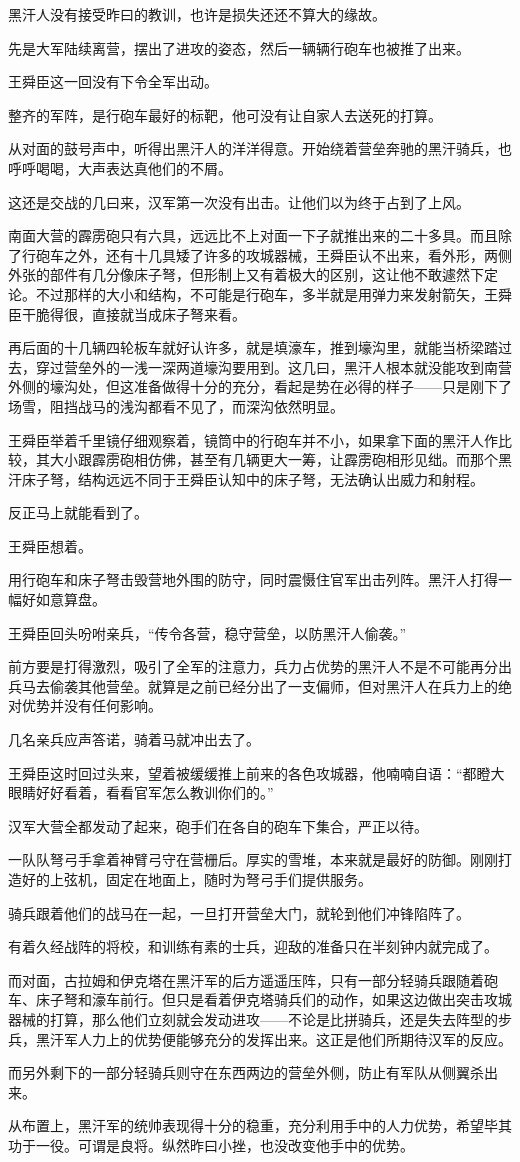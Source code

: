 黑汗人没有接受昨曰的教训，也许是损失还还不算大的缘故。

先是大军陆续离营，摆出了进攻的姿态，然后一辆辆行砲车也被推了出来。

王舜臣这一回没有下令全军出动。

整齐的军阵，是行砲车最好的标靶，他可没有让自家人去送死的打算。

从对面的鼓号声中，听得出黑汗人的洋洋得意。开始绕着营垒奔驰的黑汗骑兵，也呼呼喝喝，大声表达真他们的不屑。

这还是交战的几曰来，汉军第一次没有出击。让他们以为终于占到了上风。

南面大营的霹雳砲只有六具，远远比不上对面一下子就推出来的二十多具。而且除了行砲车之外，还有十几具矮了许多的攻城器械，王舜臣认不出来，看外形，两侧外张的部件有几分像床子弩，但形制上又有着极大的区别，这让他不敢遽然下定论。不过那样的大小和结构，不可能是行砲车，多半就是用弹力来发射箭矢，王舜臣干脆得很，直接就当成床子弩来看。

再后面的十几辆四轮板车就好认许多，就是填濠车，推到壕沟里，就能当桥梁踏过去，穿过营垒外的一浅一深两道壕沟要用到。这几曰，黑汗人根本就没能攻到南营外侧的壕沟处，但这准备做得十分的充分，看起是势在必得的样子——只是刚下了场雪，阻挡战马的浅沟都看不见了，而深沟依然明显。

王舜臣举着千里镜仔细观察着，镜筒中的行砲车并不小，如果拿下面的黑汗人作比较，其大小跟霹雳砲相仿佛，甚至有几辆更大一筹，让霹雳砲相形见绌。而那个黑汗床子弩，结构远远不同于王舜臣认知中的床子弩，无法确认出威力和射程。

反正马上就能看到了。

王舜臣想着。

用行砲车和床子弩击毁营地外围的防守，同时震慑住官军出击列阵。黑汗人打得一幅好如意算盘。

王舜臣回头吩咐亲兵，“传令各营，稳守营垒，以防黑汗人偷袭。”

前方要是打得激烈，吸引了全军的注意力，兵力占优势的黑汗人不是不可能再分出兵马去偷袭其他营垒。就算是之前已经分出了一支偏师，但对黑汗人在兵力上的绝对优势并没有任何影响。

几名亲兵应声答诺，骑着马就冲出去了。

王舜臣这时回过头来，望着被缓缓推上前来的各色攻城器，他喃喃自语：“都瞪大眼睛好好看着，看看官军怎么教训你们的。”

汉军大营全都发动了起来，砲手们在各自的砲车下集合，严正以待。

一队队弩弓手拿着神臂弓守在营栅后。厚实的雪堆，本来就是最好的防御。刚刚打造好的上弦机，固定在地面上，随时为弩弓手们提供服务。

骑兵跟着他们的战马在一起，一旦打开营垒大门，就轮到他们冲锋陷阵了。

有着久经战阵的将校，和训练有素的士兵，迎敌的准备只在半刻钟内就完成了。

而对面，古拉姆和伊克塔在黑汗军的后方遥遥压阵，只有一部分轻骑兵跟随着砲车、床子弩和濠车前行。但只是看着伊克塔骑兵们的动作，如果这边做出突击攻城器械的打算，那么他们立刻就会发动进攻——不论是比拼骑兵，还是失去阵型的步兵，黑汗军人力上的优势便能够充分的发挥出来。这正是他们所期待汉军的反应。

而另外剩下的一部分轻骑兵则守在东西两边的营垒外侧，防止有军队从侧翼杀出来。

从布置上，黑汗军的统帅表现得十分的稳重，充分利用手中的人力优势，希望毕其功于一役。可谓是良将。纵然昨曰小挫，也没改变他手中的优势。
